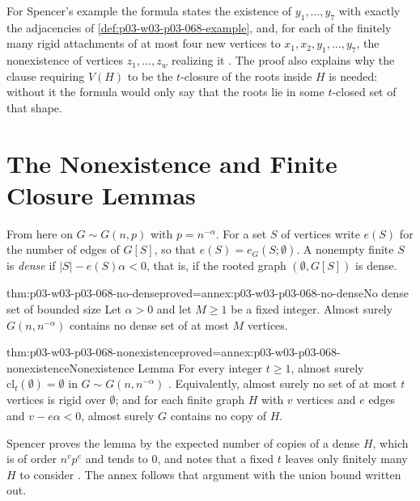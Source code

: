 For Spencer's example the formula states the existence of
\(y_1,\ldots,y_7\) with exactly the adjacencies of
\cref{def:p03-w03-p03-068-example}, and, for each of the finitely many rigid
attachments of at most four new vertices to \(x_1,x_2,y_1,\ldots,y_7\), the
nonexistence of vertices \(z_1,\ldots,z_w\) realizing it
\cite[p.~9]{Spencer2007LogicRandomStructuresAuthor}.  The proof also explains why the clause
requiring \(V(H)\) to be the \(t\)-closure of the roots inside \(H\) is
needed: without it the formula would only say that the roots lie in some
\(t\)-closed set of that shape.

\section{The Nonexistence and Finite Closure Lemmas}
\label{sec:p03-w03-p03-068-lemmas}

From here on \(G\sim G(n,p)\) with \(p=n^{-\alpha}\).  For a set \(S\) of
vertices write \(e(S)\) for the number of edges of \(G[S]\), so that
\(e(S)=e_G(S;\emptyset)\).  A nonempty finite \(S\) is \emph{dense} if
\(|S|-e(S)\alpha<0\), that is, if the rooted graph \((\emptyset,G[S])\) is
dense.

\begin{hblemma}{thm:p03-w03-p03-068-no-dense}{proved=annex:p03-w03-p03-068-no-dense}{No dense set of bounded size}
Let \(\alpha>0\) and let \(M\geq1\) be a fixed integer.  Almost surely
\(G(n,n^{-\alpha})\) contains no dense set of at most \(M\) vertices.
\end{hblemma}

\begin{hbtheorem}{thm:p03-w03-p03-068-nonexistence}{proved=annex:p03-w03-p03-068-nonexistence}{Nonexistence Lemma}
For every integer \(t\geq1\), almost surely
\(\mathrm{cl}_t(\emptyset)=\emptyset\) in \(G\sim G(n,n^{-\alpha})\)
\cite[p.~8]{Spencer2007LogicRandomStructuresAuthor}.  Equivalently, almost surely no set of
at most \(t\) vertices is rigid over \(\emptyset\); and for each finite graph
\(H\) with \(v\) vertices and \(e\) edges and \(v-e\alpha<0\), almost surely
\(G\) contains no copy of \(H\).
\end{hbtheorem}

Spencer proves the lemma by the expected number of copies of a dense \(H\),
which is of order \(n^vp^e\) and tends to \(0\), and notes that a fixed \(t\)
leaves only finitely many \(H\) to consider
\cite[p.~8]{Spencer2007LogicRandomStructuresAuthor}.  The annex follows that argument with
the union bound written out.

